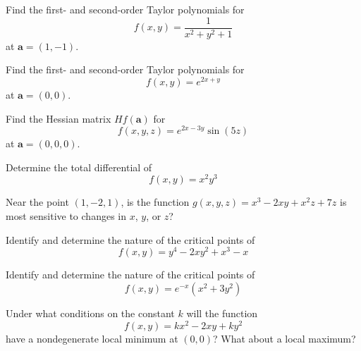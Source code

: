 \documentclass[boxes]{gsypset}
\begin{document}
\begin{problem}[4.1.9]
	Find the first- and second-order Taylor polynomials for
	\[
		f(x,y) = \frac{1}{x^2 + y^2 + 1}
	\]
	at $\mathbf{a} = (1,-1)$.
\end{problem}
\begin{solution}
	
\end{solution}

\begin{problem}[4.1.10]
	Find the first- and second-order Taylor polynomials for
	\[
		f(x,y) = e^{2x + y}
	\]
	at $\mathbf{a} = (0,0)$.
\end{problem}
\begin{solution}
	
\end{solution}

\begin{problem}[4.1.20]
	Find the Hessian matrix $H f(\mathbf{a})$ for
	\[
		f(x,y,z) = e^{2x - 3y} \sin(5z)
	\]
	at $\mathbf{a} = (0,0,0)$.
\end{problem}
\begin{solution}
	
\end{solution}

\begin{problem}[4.1.28]
	Determine the total differential of
	\[
		f(x,y) = x^2 y^3
	\]
\end{problem}
\begin{solution}
	
\end{solution}

\begin{problem}[4.1.34]
	Near the point $(1,-2,1)$, is the function
	$g(x,y,z) = x^3 - 2xy + x^2z + 7z$
	is most sensitive to changes in $x$, $y$, or $z$?
\end{problem}
\begin{solution}
	
\end{solution}

\begin{problem}[4.2.6]
	Identify and determine the nature of the critical points of
	\[
		f(x,y) = y^4 - 2xy^2 + x^3 - x
	\]
\end{problem}
\begin{solution}
	
\end{solution}

\begin{problem}[4.2.12]
	Identify and determine the nature of the critical points of
	\[
		f(x,y) = e^{-x} (x^2 + 3y^2)
	\]
\end{problem}
\begin{solution}
	
\end{solution}

\begin{problem}[4.2.22a]
	Under what conditions on the constant $k$ will the function
	\[
		f(x,y) = kx^2 - 2xy + ky^2
	\]
	have a nondegenerate local minimum at $(0,0)$?
	What about a local maximum?
\end{problem}
\begin{solution}
	
\end{solution}
\end{document}
